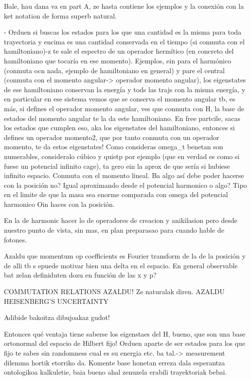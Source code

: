\documentclass[11pt, a4paper]{article} %
\begin{document}
Bale, hau dana va en part A, ze hasta contiene los ejemplos y la conexión con la ket notation de forma superb natural.

- Orduen si buscas los estados para los que una cantidad es la misma para toda trayectoria y encima es una cantidad conservada en el tiempo (si conmuta con el hamiltoniano)-z te sale el espectro de un operador hermítico (en concreto del hamiltoniano que tocaría en ese momento). Ejemplos, ein para el harmónico (conmuta ocn nada, ejemplo de hamiltoniano en general) y pare el central (conmuta con el momento angular-> operador momento angular), los eigenstates de ese hamiltoniano conservan la energía y tods las trajs con la misma energía, y en particular en ese sistema vemos que se conserva el momento angular tb, es más, si defines el operador momento angular, ves que conmuta con H, la base de estados del momento angular te la da este hamiltoniano. En free partcile, sacas los estados que cumplen eso, aka los eigenstates del hamiltoniano, entonces si defines un operador momento2, que por tanto conmuta con un operador momento, te da estos eigenstates! Como consideras omega\_t benetan son numerables, consideralo cúbico y quietp por ejemplo (que en verdad es como si fuese un potencial infinito cage), ta gero ein la aprox de que sería si hubiese infinito espacio. Conmuta con el momento lineal. Ba algo así debe poder hacerse con la posición no? Igual aproximando desde el potencial harmonico o algo? Tipo en el limite de que la masa sea enorme comparada con omega del potencial harmonico  Oin haces con la posición.

En la de harmonic hacer lo de operadores de creacion y anikilasion pero desde nuestro punto de vista, sin mas, en plan preparasao para cuando hable de fotones.

Azaldu que momentum op coefficients es Fourier transform de la de la posición y de alli tb s epuede motivar bien una delta en el espacio.
En general observable bat zelan definiduten dozu en función de las x y p?

COMMUTATION RELATIONS AZALDU! Ze naturalak diren.
AZALDU HEISENBERG'S UNCERTAINTY

Adibide bakoitza dibujoakaz gudot!

Entonces qué ventaja tiene saberse los eigenstaes del H, bueno, que son una base ortonormal del espacio de Hilbert fijo! Orduen aparte de ser estados para los que fijo te sabes sin randomness cual es su energia etc. ba tal.-> measurement dilemma hortik etorriko da. Komente base honetan erreza dala esperantza ontologikoa kalkuletie, baia bueno ahal zenuzela erabili trayektoriak bebai.
\end{document}
